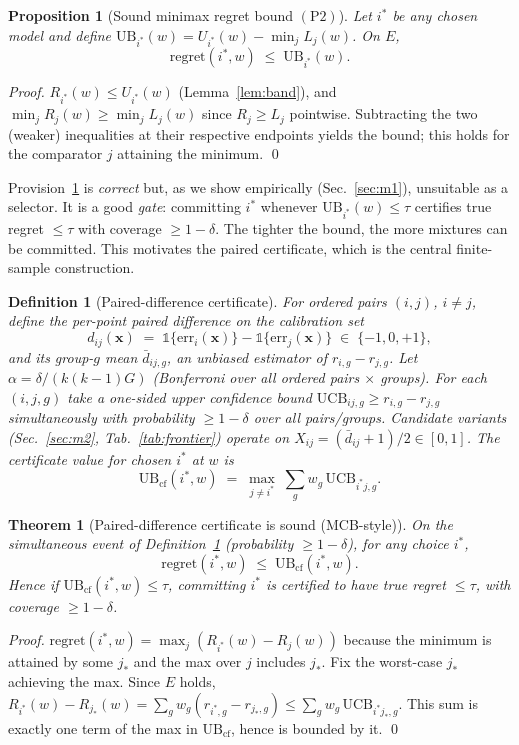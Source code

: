 \documentclass{article}
\newtheorem{theorem}{Theorem}
\newtheorem{proposition}{Proposition}
\newtheorem{definition}{Definition}
\begin{document}
\begin{proposition}[Sound minimax regret bound $(\mathrm{P2})$]
\label{prop:p2}
Let $i^*$ be any chosen model and define
$\mathrm{UB}_{i^*}(w)=U_{i^*}(w)-\min_j L_j(w)$. On $E$,
\[
  \mathrm{regret}(i^*,w)\;\le\;\mathrm{UB}_{i^*}(w).
\]
\end{proposition}
\begin{proof}
$R_{i^*}(w)\le U_{i^*}(w)$ (Lemma~\ref{lem:band}), and
$\min_j R_j(w)\ge \min_j L_j(w)$ since $R_j\ge L_j$ pointwise. Subtracting the two
(weaker) inequalities at their respective endpoints yields the bound; this holds for the
comparator $j$ attaining the minimum. \qed
\end{proof}

Provision~\ref{prop:p2} is \emph{correct} but, as we show empirically
(Sec.~\ref{sec:m1}), unsuitable as a selector. It is a good \emph{gate}: committing $i^*$
whenever $\mathrm{UB}_{i^*}(w)\le\tau$ certifies true regret $\le\tau$ with coverage
$\ge1-\delta$. The tighter the bound, the more mixtures can be committed. This motivates the
paired certificate, which is the central finite-sample construction.

\begin{definition}[Paired-difference certificate]
\label{def:paired}
For ordered pairs $(i,j)$, $i\ne j$, define the per-point paired difference on the
calibration set
\[
  d_{ij}(\mathbf{x}) \;=\; \mathbb{1}\{\text{err}_i(\mathbf{x})\}
        - \mathbb{1}\{\text{err}_j(\mathbf{x})\} \;\in\; \{-1,0,+1\},
\]
and its group-$g$ mean $\bar d_{ij,g}$, an unbiased estimator of $r_{i,g}-r_{j,g}$.
Let $\alpha=\delta/(k(k-1)G)$ (Bonferroni over all ordered pairs $\times$ groups). For each
$(i,j,g)$ take a one-sided upper confidence bound
$\mathrm{UCB}_{ij,g}\ge r_{i,g}-r_{j,g}$ simultaneously with probability $\ge1-\delta$
over all pairs/groups. Candidate variants (Sec.~\ref{sec:m2}, Tab.~\ref{tab:frontier})
operate on $X_{ij}=(\bar d_{ij}+1)/2\in[0,1]$. The certificate value for chosen $i^*$ at $w$ is
\[
  \mathrm{UB}_{\mathrm{cf}}(i^*,w) \;=\;
  \max_{j\ne i^*}\;\sum_{g} w_g\, \mathrm{UCB}_{i^*j,g}.
\]
\end{definition}

\begin{theorem}[Paired-difference certificate is sound (MCB-style)]
\label{thm:m25}
On the simultaneous event of Definition~\ref{def:paired} (probability $\ge1-\delta$), for
\emph{any} choice $i^*$,
\[
  \mathrm{regret}(i^*,w)\;\le\;\mathrm{UB}_{\mathrm{cf}}(i^*,w).
\]
Hence if $\mathrm{UB}_{\mathrm{cf}}(i^*,w)\le\tau$, committing $i^*$ is certified to have
true regret $\le\tau$, with coverage $\ge1-\delta$.
\end{theorem}
\begin{proof}
$\mathrm{regret}(i^*,w)=\max_j(R_{i^*}(w)-R_j(w))$ because the minimum is attained by some
$j_*$ and the max over $j$ includes $j_*$. Fix the worst-case $j_*$ achieving the max. Since
$E$ holds, $R_{i^*}(w)-R_{j_*}(w)=\sum_g w_g(r_{i^*,g}-r_{j_*,g})
\le \sum_g w_g\,\mathrm{UCB}_{i^*j_*,g}$. This sum is exactly one term of the max in
$\mathrm{UB}_{\mathrm{cf}}$, hence is bounded by it. \qed
\end{proof}
\end{document}
